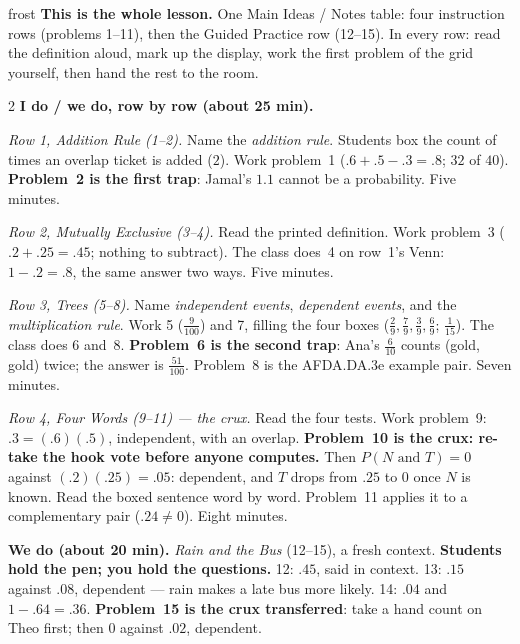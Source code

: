 \documentclass[10pt]{article}
\begin{document}
\boxguard
\begin{skillbox}{frost}
\textbf{This is the whole lesson.} One Main Ideas / Notes table: four instruction rows (problems
1--11), then the Guided Practice row (12--15). In every row: read the definition aloud, mark up
the display, work the first problem of the grid yourself, then hand the rest to the room.
\begin{multicols}{2}
\textbf{I do / we do, row by row (about 25 min).}

\emph{Row 1, Addition Rule (1--2).} Name the \emph{addition rule}. Students box the count of
times an overlap ticket is added ($2$). Work problem~1 ($.6 + .5 - .3 = .8$; $32$ of $40$).
\textbf{Problem~2 is the first trap}: Jamal's $1.1$ cannot be a probability. Five minutes.

\emph{Row 2, Mutually Exclusive (3--4).} Read the printed definition. Work problem~3 ($.2 + .25
= .45$; nothing to subtract). The class does~4 on row~1's Venn: $1 - .2 = .8$, the same answer
two ways. Five minutes.

\emph{Row 3, Trees (5--8).} Name \emph{independent events}, \emph{dependent events}, and the
\emph{multiplication rule}. Work 5 ($\frac{9}{100}$) and 7, filling the four boxes
($\frac{2}{9}, \frac{7}{9}, \frac{3}{9}, \frac{6}{9}$; $\frac{1}{15}$). The class does 6 and~8.
\textbf{Problem~6 is the second trap}: Ana's $\frac{6}{10}$ counts (gold, gold) twice; the answer
is $\frac{51}{100}$. Problem~8 is the AFDA.DA.3e example pair. Seven minutes.

\emph{Row 4, Four Words (9--11) --- the crux.} Read the four tests. Work problem~9: $.3 = (.6)(.5)$,
independent, with an overlap. \textbf{Problem~10 is the crux: re-take the hook vote before anyone
computes.} Then $P(N \text{ and } T) = 0$ against $(.2)(.25) = .05$: dependent, and $T$ drops from
$.25$ to $0$ once $N$ is known. Read the boxed sentence word by word. Problem~11 applies it to a
complementary pair ($.24 \neq 0$). Eight minutes.

\columnbreak
\textbf{We do (about 20 min).} \emph{Rain and the Bus} (12--15), a fresh context. \textbf{Students
hold the pen; you hold the questions.} 12: $.45$, said in context. 13: $.15$ against $.08$,
dependent --- rain makes a late bus more likely. 14: $.04$ and $1 - .64 = .36$. \textbf{Problem~15
is the crux transferred}: take a hand count on Theo first; then $0$ against $.02$, dependent.


\end{multicols}
\end{skillbox}
\end{document}
